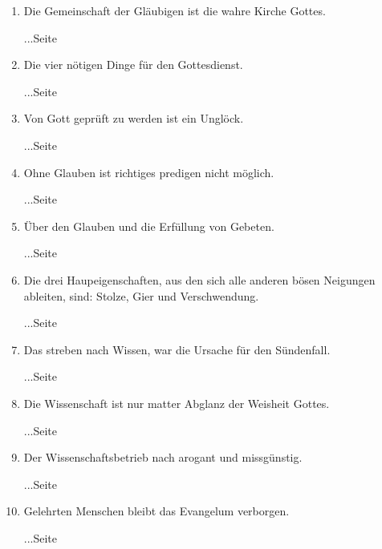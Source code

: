 \begin{enumerate}
 \item Die Gemeinschaft der Gläubigen ist die wahre Kirche Gottes.
 \begin{flushright}...Seite \pageref{ref:06_12_wahre_kirche}\end{flushright}
 \item Die vier nötigen Dinge für den Gottesdienst.
 \begin{flushright}...Seite
\pageref{ref:06_13_vier_noetige_dinge}\end{flushright}
 \item Von Gott geprüft zu werden ist ein Unglöck.
 \begin{flushright}...Seite
\pageref{ref:06_13_auf_die_probe_gestellt}\end{flushright}
 \item Ohne Glauben ist richtiges predigen nicht möglich.
 \begin{flushright}...Seite \pageref{ref:06_14_predigt}\end{flushright}
 \item Über den Glauben und die Erfüllung von Gebeten.
 \begin{flushright}...Seite \pageref{ref:06_14_gebetserfuellung}\end{flushright}
 \item Die drei Haupeigenschaften, aus den sich alle anderen bösen Neigungen
ableiten, sind: Stolze, Gier und Verschwendung.
 \begin{flushright}...Seite
\pageref{ref:07_01_drei_haupteigenschaften}\end{flushright}
 \item Das streben nach Wissen, war die Ursache für den Sündenfall. 
 \begin{flushright}...Seite \pageref{ref:07_03_wissen_erbsuende}\end{flushright}
 \item Die Wissenschaft ist nur matter Abglanz der Weisheit Gottes.
 \begin{flushright}...Seite \pageref{ref:07_03_wissen_erbsuende}\end{flushright}
 \item Der Wissenschaftsbetrieb nach arogant und missgünstig.
 \begin{flushright}...Seite \pageref{ref:07_06_wissenschaft}\end{flushright}
 \item Gelehrten Menschen bleibt das Evangelum verborgen.
 \begin{flushright}...Seite \pageref{ref:07_13_gelehrte}\end{flushright}

\end{enumerate}
